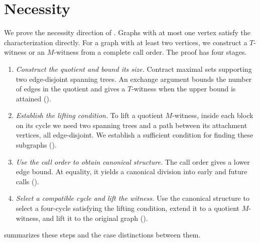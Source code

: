 \documentclass[USenglish, a4paper, thm-restate,numberwithinsect, cleveref]{lipics-v2021}
\begin{document}
\section{Necessity}
\label{sec:necessity-self-contained}
We prove the necessity direction of .
Graphs with at most one vertex satisfy the characterization directly.
For a graph with at least two vertices, we construct a $T$-witness or
an $M$-witness from a complete call order. The proof has four stages.
\begin{enumerate}
\item \emph{Construct the quotient and bound its size.}
Contract maximal sets supporting two edge-disjoint spanning trees.
An exchange argument bounds the number of edges in the quotient and
gives a $T$-witness when the upper bound is attained
().
\item \emph{Establish the lifting condition.}
To lift a quotient $M$-witness, inside each block on its cycle we need
two spanning trees and a path between its attachment vertices, all
edge-disjoint. We establish a sufficient condition for finding these
subgraphs ().
\item \emph{Use the call order to obtain canonical structure.}
The call order gives a lower edge bound. At equality, it yields a
canonical division into early and future calls
().
\item \emph{Select a compatible cycle and lift the witness.}
Use the canonical structure to select a four-cycle satisfying the
lifting condition, extend it to a quotient $M$-witness, and lift it to
the original graph
().
\end{enumerate}
 summarizes these steps and the case distinctions between them.
\end{document}
